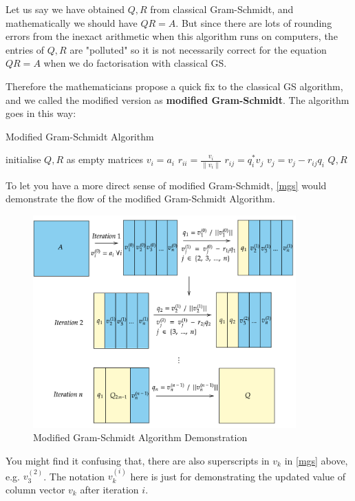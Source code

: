 \noindent Let us say we have obtained \(Q, R\) from classical Gram-Schmidt, and mathematically we should have \(QR = A\). But since there are lots of rounding errors from the inexact arithmetic when this algorithm runs on computers, the entries of \(Q, R\)  are "polluted" so it is not necessarily correct for the equation \(QR = A\) when we do factorisation with classical GS. \medskip

\noindent Therefore the mathematicians propose a quick fix to the classical GS algorithm, and we called the modified version as \textbf{modified Gram-Schmidt}. The algorithm goes in this way:

\begin{algorithm}
\caption{Modified Gram-Schmidt Algorithm}
\label{mgs-algorithm}
\begin{algorithmic}[1]
  \State initialise \(Q, R\)  as empty matrices
    \State \(v_i = a_i\)
    \State \(r_{ii} = \frac{v_i}{\|v_i\|}\)  
      \State \(r_{ij} = q_i^{*}v_j\)
      \State \(v_j = v_j - r_{ij}q_i\)
    \EndFor
  \EndFor
  \State \Return \(Q, R\)
\EndProcedure
\end{algorithmic}
\end{algorithm}

\noindent To let you have a more direct sense of modified Gram-Schmidt, \autoref{mgs} would demonstrate the flow of the modified Gram-Schmidt Algorithm. \medskip
\begin{figure}[H]
  \centering
  \includegraphics[width=0.9\textwidth]{imgs/mgs.png}
  \caption{Modified Gram-Schmidt Algorithm Demonstration}
  \label{mgs}
\end{figure}
\noindent You might find it confusing that, there are also superscripts in \(v_k\)  in \autoref{mgs} above, e.g. \(v_3^{(2)}\). The notation \(v_k^{(i)}\)  here is just for demonstrating the updated value of column vector \(v_k\) after iteration \(i\). 

